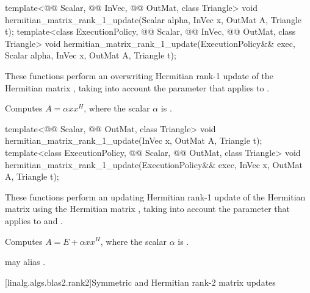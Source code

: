 %
\begin{itemdecl}
template<@@ Scalar, @@ InVec, @@ OutMat, class Triangle>
  void hermitian_matrix_rank_1_update(Scalar alpha, InVec x, OutMat A, Triangle t);
template<class ExecutionPolicy,
         @@ Scalar, @@ InVec, @@ OutMat, class Triangle>
  void hermitian_matrix_rank_1_update(ExecutionPolicy&& exec,
                                      Scalar alpha, InVec x, OutMat A, Triangle t);
\end{itemdecl}

\begin{itemdescr}
\pnum
These functions perform
an overwriting Hermitian rank-1 update of the Hermitian matrix ,
taking into account the  parameter
that applies to .

\pnum
\effects
Computes $A = \alpha x x^H$,
where the scalar $\alpha$ is .
\end{itemdescr}

%
\begin{itemdecl}
template<@@ Scalar, @@ OutMat, class Triangle>
  void hermitian_matrix_rank_1_update(InVec x, OutMat A, Triangle t);
template<class ExecutionPolicy,
         @@ Scalar, @@ OutMat, class Triangle>
  void hermitian_matrix_rank_1_update(ExecutionPolicy&& exec, InVec x, OutMat A, Triangle t);
\end{itemdecl}

\begin{itemdescr}
\pnum
These functions perform
an updating Hermitian rank-1 update of the Hermitian matrix 
using the Hermitian matrix ,
taking into account the  parameter
that applies to  and .

\pnum
\effects
Computes $A = E + \alpha x x^H$,
where the scalar $\alpha$ is .

\pnum
\remarks
{} may alias .
\end{itemdescr}

[linalg.algs.blas2.rank2]{Symmetric and Hermitian rank-2 matrix updates}

